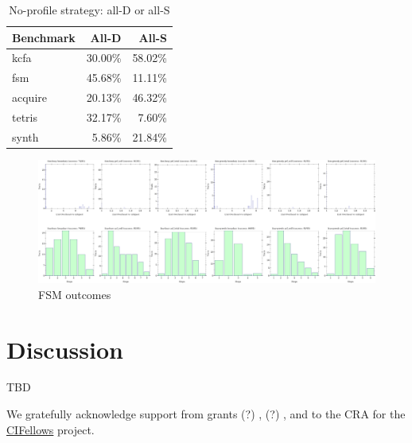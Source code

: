 \documentclass[acmsmall,review,anonymous]{acmart}
\begin{document}
\begin{table}[t]
  \caption{No-profile strategy: all-D or all-S}
  \label{t:micros}
  \begin{tabular}{lrr}
    Benchmark & All-D & All-S \\\midrule
    kcfa & 30.00\% & 58.02\% \\
    fsm & 45.68\% & 11.11\% \\
    acquire & 20.13\% & 46.32\% \\
    tetris & 32.17\% & 7.60\% \\
    synth & 5.86\% & 21.84\% \\
  \end{tabular}

\end{table}

\begin{figure}[t]
  \includegraphics[width=\columnwidth]{img/sample.png}
  \caption{FSM outcomes}
  \label{f:sample}
\end{figure}


\section{Discussion}
\label{s:conclusion}
\label{s:discussion}



\begin{acks}
  TBD

We gratefully acknowledge support from
 grants
  (?) \href{"https://www.nsf.gov/awardsearch/showAward?AWD_ID=1763922"}{},
  (?) \href{"https://www.nsf.gov/awardsearch/showAward?AWD_ID=1823244"}{},
 and
 \href{"https://www.nsf.gov/awardsearch/showAward?AWD_ID=2030859"}{}
  to the CRA for the \href{https://cifellows2020.org}{CIFellows} project.
\end{acks}



\end{document}
